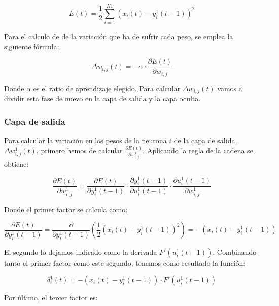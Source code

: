 \documentclass[a4paper,11pt]{article}
\begin{document}
\begin{equation}
	E(t) = \frac{1}{2}\sum_{i=1}^{N1}\left(x_{i}(t) - y_{i}^{1}(t-1)\right)^{2}
\end{equation}

Para el calculo de de la variación que ha de sufrir cada peso, se emplea la siguiente fórmula: 

\begin{equation}
	\label{elman_variacion_delta}
	\Delta w_{i,j}(t) = -\alpha \cdot \frac{\partial E(t)}{\partial w_{i,j}}
\end{equation}

Donde ${\alpha}$ es el ratio de aprendizaje elegido. Para calcular ${\Delta w_{i,j}(t)}$ vamos a dividir esta fase de nuevo en la capa de salida y la capa oculta.

\subsubsection{Capa de salida}
Para calcular la variación en los pesos de la neurona ${i}$ de la capa de salida, ${\Delta w_{i,j}^{1}(t)}$, primero hemos de calcular ${\frac{\partial E(t)}{\partial w_{i,j}^{1}}}$. Aplicando la regla de la cadena se obtiene:

\begin{equation}
	\frac{\partial E(t)}{\partial w_{i,j}^{1}} = \frac{\partial E(t)}{\partial y_{i}^{1}(t-1)} \cdot \frac{\partial y_{i}^{1}(t-1)}{\partial u_{i}^{1}(t-1)} \cdot \frac{\partial u_{i}^{1}(t-1)}{\partial w_{i,j}^{1}}
\end{equation}

Donde el primer factor se calcula como:

\begin{equation}
	\label{elman_derivada_E}
	\frac{\partial E(t)}{\partial y_{i}^{1}(t-1)} = \frac{\partial}{\partial y_{i}^{1}(t-1)}\left(\frac{1}{2}\left(x_{i}(t)-y_{i}^{1}(t-1)\right)^{2}\right) = -\left(x_{i}(t) - y_{i}^{1}(t-1)\right)
\end{equation}

El segundo lo dejamos indicado como la derivada ${F'\left(u_{i}^{1}(t-1)\right)}$. Combinando tanto el primer factor como este segundo, tenemos como resultado la función:

\begin{equation}
	\delta_{i}^{1}(t) = -\left(x_{i}(t) - y_{i}^{1}(t-1)\right) \cdot F'\left(u_{i}^{1}(t-1)\right)
\end{equation}

Por último, el tercer factor es:
\end{document}
